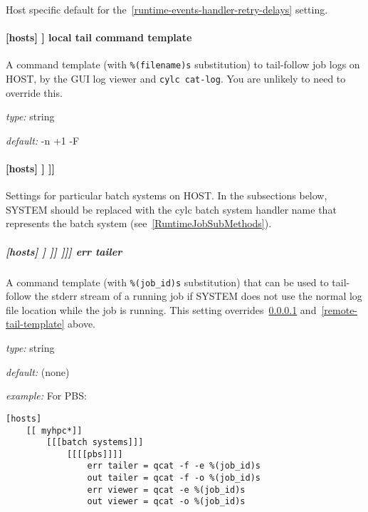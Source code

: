 Host specific default for the~\ref{runtime-events-handler-retry-delays}
setting.

\paragraph[tail command template]{[hosts] \textrightarrow [[HOST]] \textrightarrow local tail command template}
\label{local-tail-template}

A command template (with \lstinline=%(filename)s= substitution) to tail-follow
job logs on HOST, by the GUI log viewer and \lstinline=cylc cat-log=. You are
unlikely to need to override this.

\begin{myitemize}
\item {\em type:} string
\item {\em default:} \lstinline@tail -n +1 -F %(filename)s@
\end{myitemize}

\paragraph[{[[[}batch systems{]]]}]{[hosts] \textrightarrow [[HOST]] \textrightarrow [[[batch systems]]]}

Settings for particular batch systems on HOST. In the subsections below, SYSTEM
should be replaced with the cylc batch system handler name that represents the
batch system (see~\ref{RuntimeJobSubMethods}).

\subparagraph[{[[[[}SYSTEM{]]]]}err tailer]{[hosts] \textrightarrow [[HOST]] \textrightarrow [[[batch systems]]] \textrightarrow [[[[SYSTEM]]]] \textrightarrow err tailer}
\label{err-tailer}

A command template (with \lstinline=%(job_id)s= substitution) that can be used
to tail-follow the stderr stream of a running job if SYSTEM does
not use the normal log file location while the job is running.  This setting
overrides~\ref{local-tail-template} and~\ref{remote-tail-template} above.

\begin{myitemize}
\item {\em type:} string
\item {\em default:} (none)
\item {\em example:} For PBS:
    \begin{lstlisting}
[hosts]
    [[ myhpc*]]
        [[[batch systems]]]
            [[[[pbs]]]]
                err tailer = qcat -f -e %(job_id)s
                out tailer = qcat -f -o %(job_id)s
                err viewer = qcat -e %(job_id)s
                out viewer = qcat -o %(job_id)s
    \end{lstlisting}
\end{myitemize}


